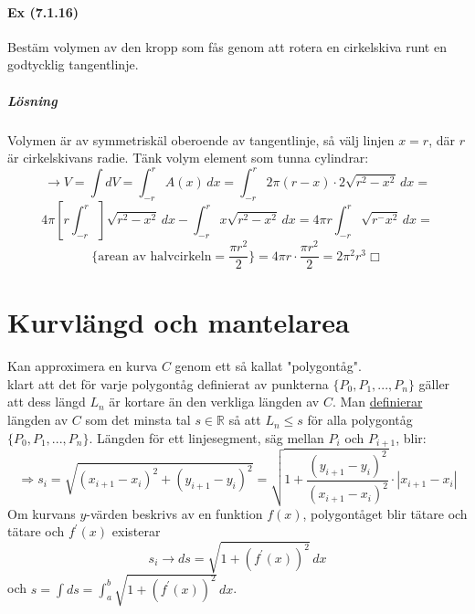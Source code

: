 \paragraph*{Ex (7.1.16)} Bestäm volymen av den kropp som fås genom att rotera en cirkelskiva runt en godtycklig tangentlinje.
\subparagraph{Lösning}
Volymen är av symmetriskäl oberoende av tangentlinje, så välj linjen $x=r$, där $r$ är cirkelskivans radie.
Tänk volym element som tunna cylindrar:
\begin{equation*}
    \rightarrow V=\int dV=\int_{-r}^r A(x)\, dx=
    \int_{-r}^r2\pi(r-x)\cdot 2\sqrt{r^2-x^2}\, dx=
\end{equation*}
\begin{equation*}
    4\pi[r\int_{-r}^r]\sqrt{r^2-x^2}\, dx - \int_{-r}^r x\sqrt{r^2-x^2}\, dx=
    4\pi r\int_{-r}^r\sqrt{r^-x^2}\, dx=
\end{equation*}
\begin{equation*}
    \{\text{arean av halvcirkeln}=\frac{\pi r^2}{2}\}=
    4\pi r\cdot\frac{\pi r^2}{2}=
    2\pi^2r^3 \Box
\end{equation*}

\section{Kurvlängd och mantelarea}
Kan approximera en kurva $C$ genom ett så kallat "polygontåg".\\
klart att det för varje polygontåg definierat av punkterna $\{P_0,P_1,...,P_n\}$ gäller att dess längd $L_n$ är kortare än den verkliga längden av $C$.
Man \underline{definierar} längden av $C$ som det minsta tal $s\in\mathbb{R}$ så att $L_n\leq s$ för alla polygontåg $\{P_0,P_1,...,P_n\}$.
Längden för ett linjesegment, säg mellan $P_i$ och $P_{i+1}$, blir:
\begin{equation*}
    \Rightarrow s_i=
    \sqrt{(x_{i+1}-x_i)^2+(y_{i+1}-y_i)^2}=
    \sqrt{1+\frac{(y_{i+1}-y_i)^2}{(x_{i+1}-x_i)^2}}\cdot |x_{i+1}-x_i|
\end{equation*}
Om kurvans $y$-värden beskrivs av en funktion $f(x)$, polygontåget blir tätare och tätare och $f^\prime(x)$ existerar
\begin{equation*}
    s_i\to ds=\sqrt{1+(f^\prime(x))^2}\, dx
\end{equation*}
och $s=\int ds=\int_a^b\sqrt{1+(f^\prime(x))^2}\, dx$.

